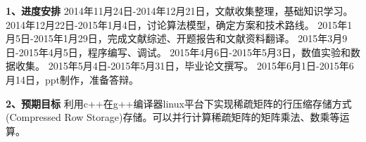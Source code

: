 \documentclass{article}
\begin{document}
     \textbf{1、进度安排}\qquad \newline
     2014年11月24日-2014年12月21日，文献收集整理，基础知识学习。\newline
2014年12月22日-2015年1月4日，讨论算法模型，确定方案和技术路线。\newline
2015年1月5日-2015年1月29日，完成文献综述、开题报告和文献资料翻译。\newline
2015年3月9日-2015年4月5日，程序编写、调试。\newline
2015年4月6日-2015年5月3日，数值实验和数据收集。\newline
2015年5月4日-2015年5月31日，毕业论文撰写。\newline
2015年6月1日-2015年6月14日，ppt制作，准备答辩。
\newline



     \textbf{2、预期目标}
     利用c++在g++编译器linux平台下实现稀疏矩阵的行压缩存储方式(Compressed Row Storage)存储。可以并行计算稀疏矩阵的矩阵乘法、数乘等运算。
\newline
 
 
 
 
\end{document}
